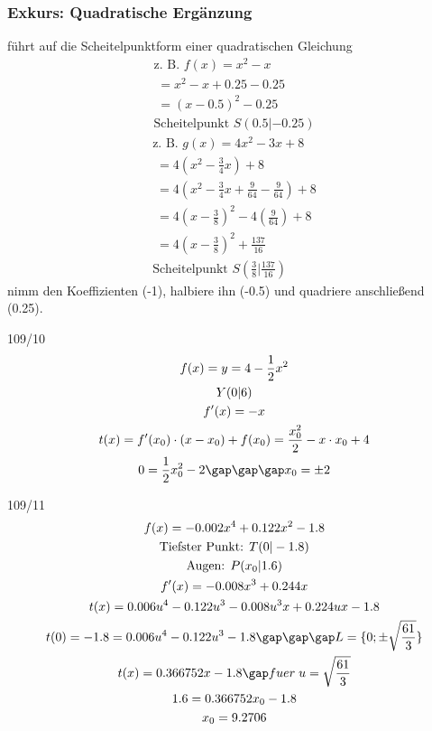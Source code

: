 \subsubsection{Exkurs: Quadratische Ergänzung}
führt auf die Scheitelpunktform einer quadratischen Gleichung
\begin{gather*}
  \text{z. B. } f(x) = x^2 - x \\
  \; = x^2 - x + 0.25 - 0.25 \\
  \; = (x - 0.5)^2 - 0.25 \\
  \text{Scheitelpunkt } S(0.5|-0.25)
\end{gather*}
\begin{gather*}
  \text{z. B. } g(x) = 4x^2 - 3x + 8 \\
  \; = 4(x^2 - \frac{3}{4}x) + 8 \\
  \; = 4(x^2 - \frac{3}{4}x + \frac{9}{64} - \frac{9}{64}) + 8 \\
  \; = 4(x - \frac{3}{8})^2 - 4(\frac{9}{64}) + 8 \\
  \; = 4(x - \frac{3}{8})^2 + \frac{137}{16} \\
  \text{Scheitelpunkt } S(\frac{3}{8}|\frac{137}{16})
\end{gather*}
nimm den Koeffizienten (-1), halbiere ihn (-0.5) und quadriere anschließend (0.25).
\begin{exercise}{109/10}
  \begin{gather*}
    f(x) = y = 4 - \frac{1}{2}x^2 \\
    Y(0|6) \\
    f'(x) = -x \\
    t(x) = f'(x_0) \cdot (x - x_0) + f(x_0) = \frac{x_0^2}{2} - x \cdot x_0 + 4 \\
    0 = \frac{1}{2}x_0^2 - 2 \gap\gap\gap x_0 = \pm 2
  \end{gather*}
\end{exercise}
\begin{exercise}{109/11}
  \begin{gather*}
    f(x) = -0.002x^4 + 0.122x^2 - 1.8 \\
    \text{Tiefster Punkt: } T(0|-1.8) \\
    \text{Augen: } P(x_0|1.6) \\
    f'(x) = -0.008x^3 + 0.244x \\
    t(x) = 0.006u^4 - 0.122u^3 - 0.008u^3x + 0.224ux - 1.8 \\
    t(0) = -1.8 = 0.006u^4 - 0.122u^3 - 1.8 \gap\gap\gap L = \{0; \pm\sqrt{\frac{61}{3}}\} \\
    t(x) = 0.366752x - 1.8 \gap fuer \; u = \sqrt{\frac{61}{3}} \\
    1.6 = 0.366752x_0 - 1.8 \\
    x_0 = 9.2706
  \end{gather*}
\end{exercise}

